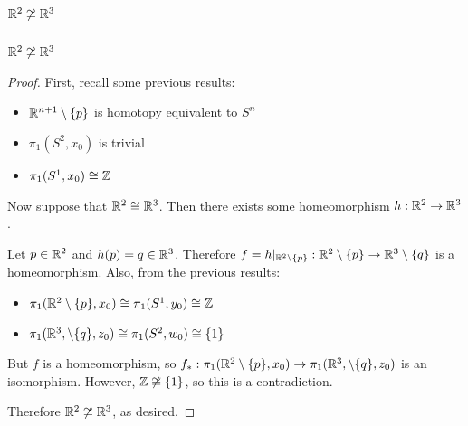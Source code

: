 \section{$\mathbb R^2 \not\cong\mathbb R^3$}
\begin{theorem} $\mathbb R^2 \not \cong \mathbb R^3$\end{theorem}
\begin{proof}
First, recall some previous results:
\begin{itemize}
\item $\mathbb R^{n+1} \setminus \{p\}$ is homotopy equivalent to $S^n$
\item $\pi_1(S^2, x_0)$ is trivial
\item $\pi_1(S^1, x_0) \cong \mathbb Z$
\end{itemize}

Now suppose that $\mathbb R^2 \cong \mathbb R^3$.  Then there exists some homeomorphism $h : \mathbb R^2 \to \mathbb R^3$.  

Let $p \in \mathbb R^2$ and $h(p) = q \in \mathbb R^3$.  Therefore $f = h|_{\mathbb R^2\setminus\{p\}} :\mathbb R^2\setminus\{p\} \to \mathbb R^3\setminus\{q\}$ is a homeomorphism. Also, from the previous results:
\begin{itemize}
\item $\pi_1(\mathbb R^2 \setminus \{p\}, x_0) \cong \pi_1(S^1, y_0) \cong \mathbb Z$
\item $\pi_1(\mathbb R^3, \setminus \{q\}, z_0) \cong \pi_1(S^2, w_0) \cong \{1\}$
\end{itemize}
But $f$ is a homeomorphism, so $f_* : \pi_1(\mathbb R^2 \setminus \{p\}, x_0) \to \pi_1(\mathbb R^3, \setminus \{q\}, z_0)$ is an isomorphism.  However, $\mathbb Z \not \cong \{1\}$, so this is a contradiction.  

Therefore $\mathbb R^2 \not \cong \mathbb R^3$, as desired.
\end{proof}

